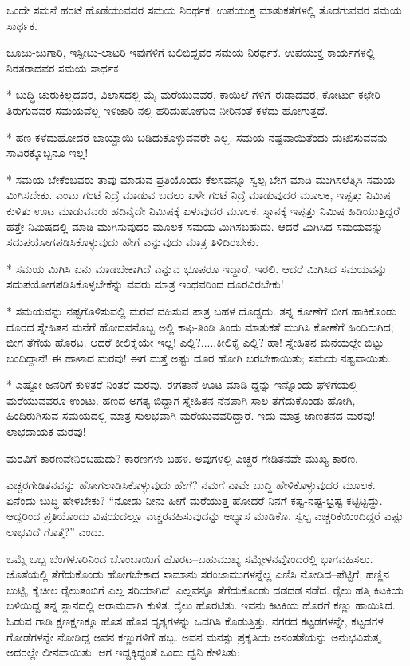 ಒಂದೇ ಸಮನೆ ಹರಟೆ ಹೊಡೆಯುವವರ ಸಮಯ ನಿರರ್ಥಕ. ಉಪಯುಕ್ತ ಮಾತುಕತೆಗಳಲ್ಲಿ ತೊಡಗುವವರ ಸಮಯ ಸಾರ್ಥಕ.

ಜೂಜು-ಜುಗಾರಿ, ಇಸ್ಪೀಟು-ಲಾಟರಿ ಇವುಗಳಿಗೆ ಬಲಿಬಿದ್ದವರ ಸಮಯ ನಿರರ್ಥಕ. ಉಪಯುಕ್ತ ಕಾರ್ಯಗಳಲ್ಲಿ ನಿರತರಾದವರ ಸಮಯ ಸಾರ್ಥಕ.

* ಬುದ್ಧಿ ಚುರುಕಿಲ್ಲದವರ, ವಿಲಾಸದಲ್ಲಿ ಮೈ ಮರೆಯುವವರ, ಕಾಯಿಲೆ ಗಳಿಗೆ ಈಡಾದವರ, ಕೋರ್ಟು ಕಛೇರಿ ತಿರುಗುವವರ ಸಮಯವೆಲ್ಲ ಇಳಿಜಾರಿ ನಲ್ಲಿ ಹರಿದುಹೋಗುವ ನೀರಿನಂತೆ ಕಳೆದು ಹೋಗುತ್ತದೆ.

* ಹಣ ಕಳೆದುಹೋದರೆ ಬಾಯ್ಬಾಯಿ ಬಡಿದುಕೊಳ್ಳುವವರೇ ಎಲ್ಲ. ಸಮಯ ನಷ್ಟವಾಯಿತೆಂದು ದುಃಖಿಸುವವನು ಸಾವಿರಕ್ಕೊಬ್ಬನೂ ಇಲ್ಲ!

* ಸಮಯ ಬೇಕೆಂಬವರು ತಾವು ಮಾಡುವ ಪ್ರತಿಯೊಂದು ಕೆಲಸವನ್ನೂ ಸ್ವಲ್ಪ ಬೇಗ ಮಾಡಿ ಮುಗಿಸಲೆತ್ನಿಸಿ ಸಮಯ ಮಿಗಿಸಬೇಕು. ಎಂಟು ಗಂಟೆ ನಿದ್ರೆ ಮಾಡುವ ಬದಲು ಏಳೇ ಗಂಟೆ ನಿದ್ರೆ ಮಾಡುವುದರ ಮೂಲಕ, ಇಪ್ಪತ್ತು ನಿಮಿಷ ಕುಳಿತು ಊಟ ಮಾಡುವವರು ಹದಿನೈದೇ ನಿಮಿಷಕ್ಕೆ ಏಳುವುದರ ಮೂಲಕ, ಸ್ನಾನಕ್ಕೆ ಇಪ್ಪತ್ತು ನಿಮಿಷ ಹಿಡಿಯುತ್ತಿದ್ದರೆ ಹತ್ತೇ ನಿಮಿಷದಲ್ಲಿ ಮಾಡಿ ಮುಗಿಸುವುದರ ಮೂಲಕ ಸಮಯ ಮಿಗಿಸಬಹುದು. ಆದರೆ ಮಿಗಿಸಿದ ಸಮಯವನ್ನು ಸದುಪಯೋಗಪಡಿಸಿಕೊಳ್ಳುವುದು ಹೇಗೆ ಎನ್ನುವುದು ಮಾತ್ರ ತಿಳಿದಿರಬೇಕು.

* ಸಮಯ ಮಿಗಿಸಿ ಏನು ಮಾಡಬೇಕಾಗಿದೆ ಎನ್ನುವ ಭೂಪರೂ ಇದ್ದಾರೆ, ಇರಲಿ. ಆದರೆ ಮಿಗಿಸಿದ ಸಮಯವನ್ನು ಸದುಪಯೋಗಪಡಿಸಿಕೊಳ್ಳಬೇಕೆನ್ನು ವವರು ಮಾತ್ರ ಇಂಥವರಿಂದ ದೂರವಿರಬೇಕು!

* ಸಮಯವನ್ನು ನಷ್ಟಗೊಳಿಸುವಲ್ಲಿ ಮರವೆ ವಹಿಸುವ ಪಾತ್ರ ಬಹಳ ದೊಡ್ಡದು. ತನ್ನ ಕೋಣೆಗೆ ಬೀಗ ಹಾಕಿಕೊಂಡು ದೂರದ ಸ್ನೇಹಿತನ ಮನೆಗೆ ಹೋದವನೊಬ್ಬ ಅಲ್ಲಿ ಕಾಫಿ-ತಿಂಡಿ ತಿಂದು ಮಾತುಕತೆ ಮುಗಿಸಿ ಕೋಣೆಗೆ ಹಿಂದಿರುಗಿದ; ಬೀಗ ತೆಗೆಯ ಹೊರಟ. ಆದರೆ ಕೀಲಿಕೈಯೇ ಇಲ್ಲ! ಎಲ್ಲಿ?.....ಕೀಲಿಕೈ ಎಲ್ಲಿ? ಹಾ! ಸ್ನೇಹಿತನ ಮನೆಯಲ್ಲೇ ಬಿಟ್ಟು ಬಂದಿದ್ದಾನೆ! ಈ ಹಾಳಾದ ಮರವು! ಈಗ ಮತ್ತೆ ಅಷ್ಟು ದೂರ ಹೋಗಿ ಬರಬೇಕಾಯಿತು; ಸಮಯ ನಷ್ಟವಾಯಿತು.

* ಎಷ್ಟೋ ಜನರಿಗೆ ಕುಳಿತರೆ-ನಿಂತರೆ ಮರವು. ಈಗತಾನೆ ಊಟ ಮಾಡಿ ದ್ದನ್ನು ಇನ್ನೊಂದು ಘಳಿಗೆಯಲ್ಲಿ ಮರೆಯುವವರೂ ಉಂಟು. ಹಣದ ಅಗತ್ಯ ಬಿದ್ದಾಗ ಸ್ನೇಹಿತನ ನೆನಪಾಗಿ ಸಾಲ ತೆಗೆದುಕೊಂಡು ಹೋಗಿ, ಹಿಂದಿರುಗಿಸುವ ಸಮಯದಲ್ಲಿ ಮಾತ್ರ ಸುಲಭವಾಗಿ ಮರೆಯುವವರಿದ್ದಾರೆ. ಇದು ಮಾತ್ರ ಜಾಣತನದ ಮರವು! ಲಾಭದಾಯಕ ಮರವು!

ಮರವಿಗೆ ಕಾರಣವೇನಿರಬಹುದು? ಕಾರಣಗಳು ಬಹಳ. ಅವುಗಳಲ್ಲಿ ಎಚ್ಚರ ಗೇಡಿತನವೇ ಮುಖ್ಯ ಕಾರಣ.

ಎಚ್ಚರಗೇಡಿತನವನ್ನು ಹೋಗಲಾಡಿಸಿಕೊಳ್ಳುವುದು ಹೇಗೆ? ನಮಗೆ ನಾವೇ ಬುದ್ಧಿ ಹೇಳಿಕೊಳ್ಳುವುದರ ಮೂಲಕ. ಏನೆಂದು ಬುದ್ಧಿ ಹೇಳಬೇಕು? “ನೋಡು ನೀನು ಹೀಗೆ ಮರೆಯುತ್ತ ಹೋದರೆ ನಿನಗೆ ಕಷ್ಟ-ನಷ್ಟ-ಭ್ರಷ್ಟ ಕಟ್ಟಿಟ್ಟದ್ದು. ಆದ್ದರಿಂದ ಪ್ರತಿಯೊಂದು ವಿಷಯದಲ್ಲೂ ಎಚ್ಚರವಹಿಸುವುದನ್ನು ಅಭ್ಯಾಸ ಮಾಡಿಕೊ. ಸ್ವಲ್ಪ ಎಚ್ಚರಿಕೆಯಿಂದಿದ್ದರೆ ಎಷ್ಟು ಲಾಭವಿದೆ ಗೊತ್ತೆ?” ಎಂದು.

ಒಮ್ಮೆ ಒಬ್ಬ ಬೆಂಗಳೂರಿನಿಂದ ಬೊಂಬಾಯಿಗೆ ಹೊರಟ–ಬಹುಮುಖ್ಯ ಸಮ್ಮೇಳನವೊಂದರಲ್ಲಿ ಭಾಗವಹಿಸಲು. ಜೊತೆಯಲ್ಲಿ ತೆಗೆದುಕೊಂಡು ಹೋಗಬೇಕಾದ ಸಾಮಾನು ಸರಂಜಾಮುಗಳನ್ನೆಲ್ಲ ಎಣಿಸಿ ನೋಡಿದ–ಪೆಟ್ಟಿಗೆ, ಹಣ್ಣಿನ ಬುಟ್ಟಿ, ಕೈಚೀಲ ರೈಲುತಂಬಿಗೆ ಎಲ್ಲ ಸರಿಯಾಗಿದೆ. ಎಲ್ಲವನ್ನೂ ತೆಗೆದುಕೊಂಡು ದಡದಡ ನಡೆದ. ರೈಲು ಹತ್ತಿ ಕಿಟಕಿಯ ಬಳಿಯಿದ್ದ ತನ್ನ ಸ್ಥಾನದಲ್ಲಿ ಆರಾಮವಾಗಿ ಕುಳಿತ. ರೈಲು ಹೊರಟಿತು. ಇವನು ಕಿಟಕಿಯ ಹೊರಗೆ ಕಣ್ಣು ಹಾಯಿಸಿದ. ಓಡುವ ಗಾಡಿ ಕ್ಷಣಕ್ಷಣಕ್ಕೂ ಹೊಸ ಹೊಸ ದೃಶ್ಯಗಳನ್ನು ಒದಗಿಸಿ ಕೊಡುತ್ತಿತ್ತು. ನಗರದ ಕಟ್ಟಡಗಳನ್ನೇ, ಕಟ್ಟಡಗಳ ಗೋಡೆಗಳನ್ನೇ ನೋಡಿದ್ದ ಅವನ ಕಣ್ಣುಗಳಿಗೆ ಹಬ್ಬ. ಅವನ ಮನಸ್ಸು ಪ್ರಕೃತಿಯ ಅನಂತತೆಯನ್ನು ಅನುಭವಿಸುತ್ತ, ಅದರಲ್ಲೇ ಲೀನವಾಯಿತು. ಆಗ ಇದ್ದಕ್ಕಿದ್ದಂತೆ ಒಂದು ಧ್ವನಿ ಕೇಳಿಸಿತು:

